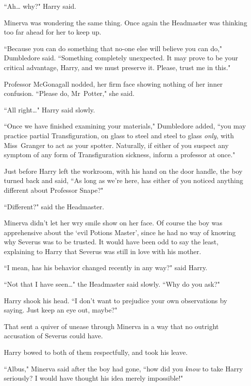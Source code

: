 ``Ah{\ldots} why?" Harry said.

Minerva was wondering the same thing. Once again the Headmaster was thinking too far ahead for her to keep up.

``Because you can do something that no-one else will believe you can do," Dumbledore said. ``Something completely unexpected. It may prove to be your critical advantage, Harry, and we must preserve it. Please, trust me in this."

Professor McGonagall nodded, her firm face showing nothing of her inner confusion. ``Please do, Mr~Potter," she said.

``All right{\ldots}" Harry said slowly.

``Once we have finished examining your materials," Dumbledore added, ``you may practice partial Transfiguration, on glass to steel and steel to glass \emph{only}, with Miss~Granger to act as your spotter. Naturally, if either of you suspect any symptom of any form of Transfiguration sickness, inform a professor at once."

Just before Harry left the workroom, with his hand on the door handle, the boy turned back and said, ``As long as we're here, has either of you noticed anything different about Professor Snape?"

``Different?" said the Headmaster.

Minerva didn't let her wry smile show on her face. Of course the boy was apprehensive about the `evil Potions Master', since he had no way of knowing why Severus was to be trusted. It would have been odd to say the least, explaining to Harry that Severus was still in love with his mother.

``I mean, has his behavior changed recently in any way?" said Harry.

``Not that I have seen{\ldots}" the Headmaster said slowly. ``Why do you ask?"

Harry shook his head. ``I don't want to prejudice your own observations by saying. Just keep an eye out, maybe?"

That sent a quiver of unease through Minerva in a way that no outright accusation of Severus could have.

Harry bowed to both of them respectfully, and took his leave.

\later

``Albus," Minerva said after the boy had gone, ``how did you \emph{know} to take Harry seriously? I would have thought his idea merely impossible!"

